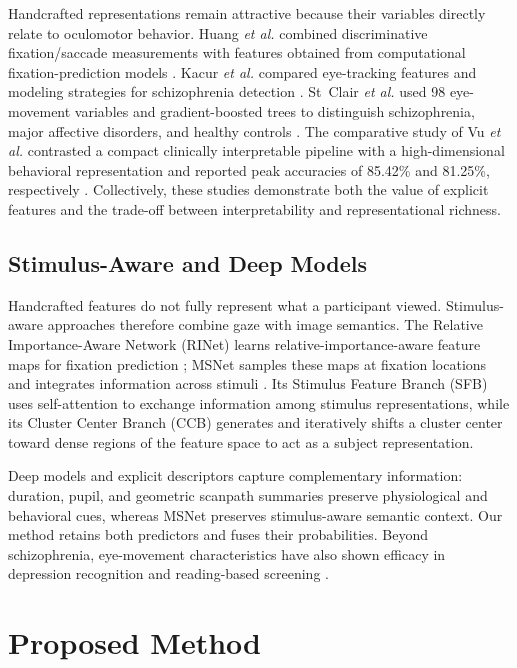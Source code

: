 \documentclass[conference,a4paper]{IEEEtran}
\begin{document}
Handcrafted representations remain attractive because their variables directly relate to oculomotor behavior. Huang \emph{et al.} combined discriminative fixation/saccade measurements with features obtained from computational fixation-prediction models \cite{huang2020effective}. Kacur \emph{et al.} compared eye-tracking features and modeling strategies for schizophrenia detection \cite{kacur2020analysis}. St~Clair \emph{et al.} used 98 eye-movement variables and gradient-boosted trees to distinguish schizophrenia, major affective disorders, and healthy controls \cite{stclair2022patterns}. The comparative study of Vu \emph{et al.} contrasted a compact clinically interpretable pipeline with a high-dimensional behavioral representation and reported peak accuracies of 85.42\% and 81.25\%, respectively \cite{vu2026comparative}. Collectively, these studies demonstrate both the value of explicit features and the trade-off between interpretability and representational richness.

\subsection{Stimulus-Aware and Deep Models}
Handcrafted features do not fully represent what a participant viewed. Stimulus-aware approaches therefore combine gaze with image semantics. The Relative Importance-Aware Network (RINet) learns relative-importance-aware feature maps for fixation prediction \cite{song2023rinet}; MSNet samples these maps at fixation locations and integrates information across stimuli \cite{song2024ems}. Its Stimulus Feature Branch (SFB) uses self-attention to exchange information among stimulus representations, while its Cluster Center Branch (CCB) generates and iteratively shifts a cluster center toward dense regions of the feature space to act as a subject representation.

Deep models and explicit descriptors capture complementary information: duration, pupil, and geometric scanpath summaries preserve physiological and behavioral cues, whereas MSNet preserves stimulus-aware semantic context. Our method retains both predictors and fuses their probabilities. Beyond schizophrenia, eye-movement characteristics have also shown efficacy in depression recognition \cite{zhang2022depression} and reading-based screening \cite{yang2024automatic}.

\section{Proposed Method}
\end{document}
